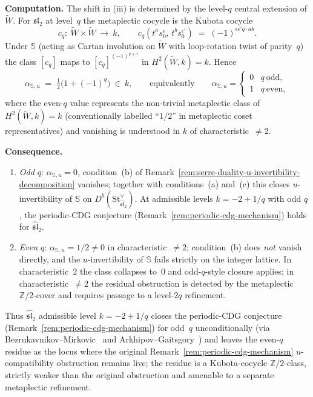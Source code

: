 \begin{proposition}
\medskip
\noindent\textbf{Computation.}
The shift in (iii) is determined by the level-$q$ central extension
of $\widetilde{W}$. For $\mathfrak{sl}_2$ at level~$q$ the metaplectic
cocycle is the Kubota cocycle~\cite{Kubota69}
\[
c_q \colon\ \widetilde{W}\times\widetilde{W}\ \longrightarrow\ k,\qquad
c_q(t^a s_0^\epsilon,\,t^b s_0^{\epsilon'}) \;=\;
(-1)^{\epsilon\epsilon' q\cdot ab}.
\]
Under $\mathbb{S}$ (acting as Cartan involution on $\widetilde{W}$
with loop-rotation twist of parity~$q$) the class $[c_q]$ maps to
$[c_q]^{(-1)^{q+1}}$ in $H^2(\widetilde{W},k) = k$. Hence
\[
\alpha_{\mathbb{S},u} \;=\; \tfrac{1}{2}\bigl(1 + (-1)^q\bigr)\ \in\ k,
\qquad\text{equivalently}\qquad
\alpha_{\mathbb{S},u} =
\begin{cases}
0 & q\ \text{odd},\\
1 & q\ \text{even},
\end{cases}
\]
where the even-$q$ value represents the non-trivial metaplectic
class of $H^2(\widetilde{W},k) = k$ (conventionally labelled
``$1/2$'' in metaplectic coset representatives) and vanishing is
understood in $k$ of characteristic~$\neq 2$.

\medskip
\noindent\textbf{Consequence.}
\begin{enumerate}[label=\textup{(\alph*)}]
\item \emph{Odd $q$}: $\alpha_{\mathbb{S},u} = 0$, condition~(b) of
Remark~\textup{\ref{rem:serre-duality-u-invertibility-decomposition}}
vanishes; together with conditions~(a) and~(c) this closes
$u$-invertibility of $\mathbb{S}$ on
$D^b(\mathrm{St}^{\vee}_{\widehat{\mathfrak{sl}}_2})$. At admissible
levels $k = -2 + 1/q$ with odd $q$, the periodic-CDG conjecture (Remark~\ref{rem:periodic-cdg-mechanism})
holds for $\widehat{\mathfrak{sl}}_2$.
\item \emph{Even $q$}: $\alpha_{\mathbb{S},u} = 1/2\neq 0$ in
characteristic~$\neq 2$; condition~(b) does \emph{not} vanish
directly, and the $u$-invertibility of $\mathbb{S}$ fails strictly
on the integer lattice. In characteristic~$2$ the class collapses
to~$0$ and odd-$q$-style closure applies; in characteristic~$\neq 2$
the residual obstruction is detected by the metaplectic
$\mathbb{Z}/2$-cover and requires passage to a level-$2q$ refinement.
\end{enumerate}
Thus $\widehat{\mathfrak{sl}}_2$ admissible level
$k = -2 + 1/q$ closes the periodic-CDG conjecture (Remark~\ref{rem:periodic-cdg-mechanism}) for odd~$q$
unconditionally (via Bezrukavnikov--Mirkovic~\cite{Bezrukavnikov16}
and Arkhipov--Gaitsgory~\cite{ArkhipovGaitsgory09}) and leaves the
even-$q$ residue as the locus where the original
Remark~\textup{\ref{rem:periodic-cdg-mechanism}}
$u$-compatibility obstruction remains live; the residue is a
Kubota-cocycle $\mathbb{Z}/2$-class, strictly weaker than the
original obstruction and amenable to a separate metaplectic
refinement.
\end{proposition}


